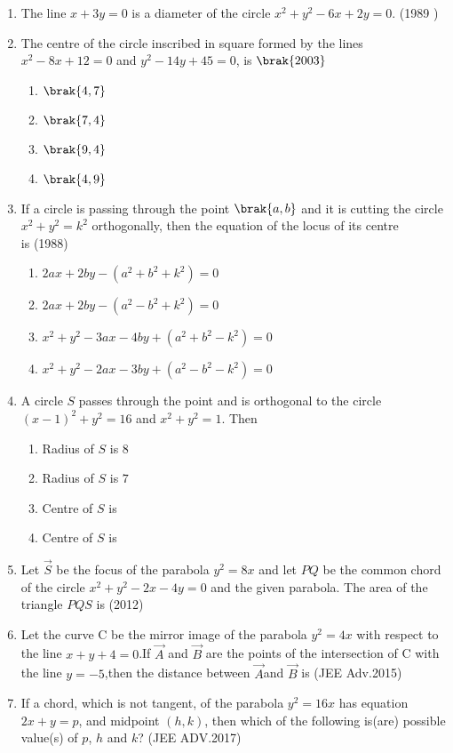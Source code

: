 	\begin{enumerate}
    \item The line $x+3y = 0$ is a diameter of the circle $ x^{2} + y^{2} - 6x +2y = 0$.
    \hfill{(1989 )}
     \item The centre of the circle inscribed in square formed by the lines $x^2-8x+12=0$ and $y^2-14y+45=0$,  is
         \hfill$\brak{2003}$
         \begin{multicols}{2}
\begin{enumerate}
         \item $\brak{4, 7}$
         \item $\brak{7, 4}$
         \item $\brak{9, 4}$
         \item $\brak{4, 9}$
     \end{enumerate}
     \end{multicols}
    \item If a circle is passing through the point $\brak{a, b}$ and it is cutting the circle $x^{2}+y^{2}=k^{2}$ orthogonally,  then the equation of the locus of its centre \\ is 
    \hfill {(1988)}
    \begin{multicols}{2}
\begin{enumerate}
    	\item $2ax + 2by - (a^{2}+b^{2}+k^{2}) = 0$
    	\item $2ax + 2by - (a^{2}-b^{2}+k^{2}) = 0$
    	\item $x^{2} + y^{2}-3ax-4by+ (a^{2}+b^{2}-k^{2}) = 0$
    	\item $x^{2} + y^{2}-2ax-3by+ (a^{2}-b^{2}-k^{2}) = 0$
    \end{enumerate}
\end{multicols}
%
\item A circle $S$ passes through the point  and is orthogonal to the circle $(x-1)^2+y^2=16$ and $x^2+y^2=1$. Then
%
\hfill {}
\begin{multicols}{2}
\begin{enumerate}
\item Radius of $S$ is $8$
\item Radius of $S$ is $7$
\item Centre of $S$ is 
\item Centre of $S$ is 
\end{enumerate}
\end{multicols}
\item Let $\Vec{S}$ be the focus of the parabola $y^2=8x$ and let $PQ$ be the common chord of the circle $x^2+y^2-2x-4y=0$ and the given parabola. The area of the triangle $PQS$ is
\hfill(2012)
\item Let the curve C be the mirror image of the parabola $y^2=4x$ with respect to the line $x+y+4=0$.If $\Vec{A}$ and $\Vec{B}$ are the points of the intersection of C with the line $y=-5$,then the distance between $\Vec{A}$and $\Vec{B}$ is
\hfill(JEE Adv.2015)
      \item If a chord, which is not tangent, of the parabola $y^2=16x$ has equation $2x+y=p$, and midpoint $(h,k)$, then which of the following is(are) possible value(s) of $p$, $h$ and $k$? 
	      \hfill(JEE ADV.2017)
	      

\end{enumerate}
